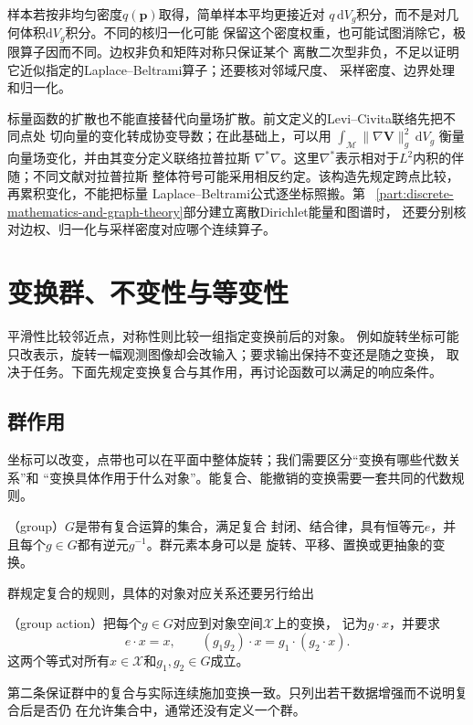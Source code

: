 样本若按非均匀密度$q(\bm{p})$取得，简单样本平均更接近对
$q\,\mathrm{d}V_g$积分，而不是对几何体积$\mathrm{d}V_g$积分。不同的核归一化可能
保留这个密度权重，也可能试图消除它，极限算子因而不同。边权非负和矩阵对称只保证某个
离散二次型非负，不足以证明它近似指定的Laplace--Beltrami算子；还要核对邻域尺度、
采样密度、边界处理和归一化。

标量函数的扩散也不能直接替代向量场扩散。前文定义的Levi--Civita联络先把不同点处
切向量的变化转成协变导数；在此基础上，可以用
$\int_{\mathcal{M}}\lVert\nabla\bm{V}\rVert_g^2\,\mathrm{d}V_g$
衡量向量场变化，并由其变分定义联络拉普拉斯
$\nabla^{*}\nabla$。这里$\nabla^{*}$表示相对于$L^2$内积的伴随；不同文献对拉普拉斯
整体符号可能采用相反约定。该构造先规定跨点比较，再累积变化，不能把标量
Laplace--Beltrami公式逐坐标照搬。第
~\ref{part:discrete-mathematics-and-graph-theory}部分建立离散Dirichlet能量和图谱时，
还要分别核对边权、归一化与采样密度对应哪个连续算子。

\section{变换群、不变性与等变性}
\label{sec:geometry-group-invariance-equivariance}

平滑性比较邻近点，对称性则比较一组指定变换前后的对象。
例如旋转坐标可能只改表示，旋转一幅观测图像却会改输入；要求输出保持不变还是随之变换，
取决于任务。下面先规定变换复合与其作用，再讨论函数可以满足的响应条件。

\subsection{群作用}

坐标可以改变，点带也可以在平面中整体旋转；我们需要区分“变换有哪些代数关系”和
“变换具体作用于什么对象”。能复合、能撤销的变换需要一套共同的代数规则。

\begin{definition}[群]
\label{def:geometry-group}
（group）$G$是带有复合运算的集合，满足复合
封闭、结合律，具有恒等元$e$，并且每个$g\in G$都有逆元$g^{-1}$。群元素本身可以是
旋转、平移、置换或更抽象的变换。
\end{definition}

群规定复合的规则，具体的对象对应关系还要另行给出

\begin{definition}[群作用]
\label{def:geometry-group-action}
（group action）把每个$g\in G$对应到对象空间$\mathcal{X}$上的变换，
记为$g\cdot x$，并要求
\begin{equation}
  e\cdot x=x,
  \qquad
  (g_1g_2)\cdot x
  =
  g_1\cdot(g_2\cdot x).
  \label{eq:geometry-group-action}
\end{equation}
这两个等式对所有$x\in\mathcal X$和$g_1,g_2\in G$成立。
\end{definition}
第二条保证群中的复合与实际连续施加变换一致。只列出若干数据增强而不说明复合后是否仍
在允许集合中，通常还没有定义一个群。

